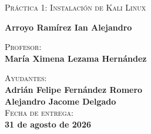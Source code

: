 \begin{titlepage}
\begin{minipage}[c][0.81\textheight][t]{0.75\textwidth}
\begin{center}
			\textsc{\LARGE Práctica 1: Instalación de Kali Linux}\\[8mm]
			\vspace{5mm}

			\vspace{2mm}
			\textbf{Arroyo Ramírez Ian Alejandro} \\
			\vspace{8mm}

			\textsc{Profesor:}\\
			\vspace{2mm}
			\textbf{María Ximena Lezama Hernández} \\
			\vspace{8mm}

			\textsc{Ayudantes:} \\
			\vspace{2mm}
			\textbf{Adrián Felipe Fernández Romero}\\
			\vspace{2mm}
			\textbf{Alejandro Jacome Delgado}\\
			\vspace{12mm}
			\textsc{Fecha de entrega:}\\
			\vspace{2mm}
			\textbf{31 de agosto de 2026}\\[0.5cm]
		\end{center}
	\end{minipage}
\end{titlepage}

